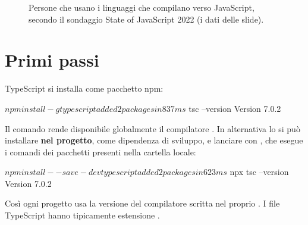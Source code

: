 \begin{figure}[H]
  \centering
  \caption{Persone che usano i linguaggi che compilano verso JavaScript, secondo
           il sondaggio State of JavaScript 2022 (i dati delle slide).}
  \label{fig:ts-adozione}
\end{figure}

\section{Primi passi}

TypeScript si installa come pacchetto npm:

\begin{console}[Terminale]
$ npm install -g typescript

added 2 packages in 837ms
$ tsc --version
Version 7.0.2
\end{console}

Il comando rende disponibile globalmente il compilatore . In
alternativa lo si può installare \textbf{nel progetto}, come dipendenza di
sviluppo, e lanciare con , che esegue i comandi dei pacchetti
presenti nella cartella  locale:

\begin{console}[Terminale]
$ npm install --save-dev typescript

added 2 packages in 623ms
$ npx tsc --version
Version 7.0.2
\end{console}

Così ogni progetto usa la versione del compilatore scritta nel proprio
. I file TypeScript hanno tipicamente estensione .

